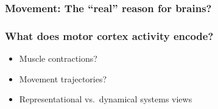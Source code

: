 \documentclass[
  letterpaper,
  DIV=11,
  numbers=noendperiod]{scrartcl}
\providecommand{\tightlist}{%
  \setlength{\itemsep}{0pt}\setlength{\parskip}{0pt}}\usepackage{longtable,booktabs,array}
\begin{document}
\subsubsection{Movement: The ``real'' reason for
brains?}\label{movement-the-real-reason-for-brains}

\subsubsection{What does motor cortex activity
encode?}\label{what-does-motor-cortex-activity-encode}

\begin{itemize}
\tightlist
\item
  Muscle contractions?
\item
  Movement trajectories?
\item
  Representational vs.~dynamical systems views
\end{itemize}
\end{document}
